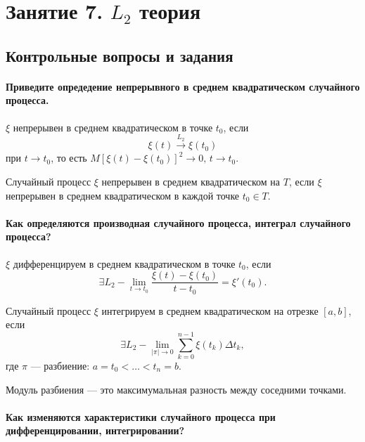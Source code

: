 \chapter*{Занятие 7. $L_2$ теория}

\section*{Контрольные вопросы и задания}

\subsubsection*{Приведите опредедение непрерывного в среднем квадратическом случайного процесса.}

$ \xi $ непрерывен в среднем квадратическом в точке $t_0$, если
$$ \xi \left( t \right) \overset{L_2}{ \to }
  \xi \left( t_0 \right) $$
при $t \to t_0$,
то есть $M \left[ \xi \left( t \right) - \xi \left( t_0 \right) \right]^2 \to 0, \, t \to t_0$.

Случайный процесс $ \xi $ непрерывен в среднем квадратическом на $T$,
если $ \xi $ непрерывен в среднем квадратическом в каждой точке $t_0 \in T$.

\subsubsection*{Как определяются производная случайного процесса, интеграл случайного процесса?}

$ \xi $ дифференцируем в среднем квадратическом в точке $t_0$, если
$$ \exists L_2-\lim \limits_{t \to t_0}
    \frac{ \xi \left(t \right) - \xi \left( t_0 \right) }{t - t_0} =
  \xi' \left( t_0 \right).$$

Случайный процесс $ \xi $ интегрируем в среднем квадратическом на отрезке $ \left[ a, b \right] $,
если
$$ \exists L_2-\lim \limits_{ \left| \pi \right| \to 0}
    \sum \limits_{k = 0}^{n - 1} \xi \left( t_k \right) \Delta t_k,$$
где $ \pi $ --- разбиение: $a = t_0 < \dotsc < t_n = b$.

Модуль разбиения --- это максимумальная разность между соседними точками.

\subsubsection*{Как изменяются характеристики случайного процесса при дифференцировании,
                интегрировании?}

